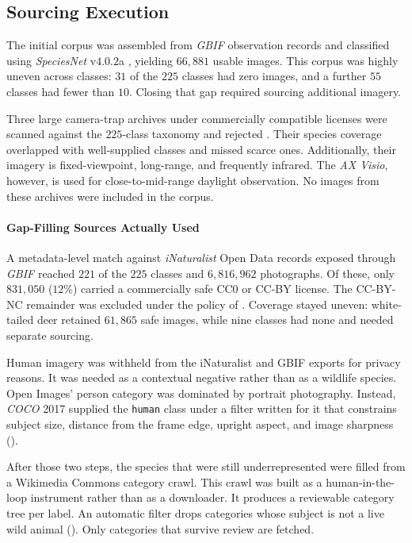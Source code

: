 \subsection{Sourcing Execution}\label{sec:sourcing_execution}

The initial corpus was assembled from \textit{GBIF} \cite{GBIF} observation records and classified using \textit{SpeciesNet} v$4.0.2$a \cite{gadotCropNotCrop2024a}, yielding $66{,}881$ usable images. This corpus was highly uneven across classes: $31$ of the $225$ classes had zero images, and a further $55$ classes had fewer than $10$. Closing that gap required sourcing additional imagery.

Three large camera-trap archives under commercially compatible licenses were scanned against the $225$-class taxonomy and rejected \cite{LILABCLabeled}. Their species coverage overlapped with well-supplied classes and missed scarce ones. Additionally, their imagery is fixed-viewpoint, long-range, and frequently infrared. The \textit{AX Visio}, however, is used for close-to-mid-range daylight observation. No images from these archives were included in the corpus.

\paragraph{Gap-Filling Sources Actually Used}
A metadata-level match against \textit{iNaturalist} Open Data records exposed through \textit{GBIF} reached $221$ of the $225$ classes and $6{,}816{,}962$ photographs. Of these, only $831{,}050$ ($12\%$) carried a commercially safe CC0 or CC-BY license. The CC-BY-NC remainder was excluded under the policy of . Coverage stayed uneven: white-tailed deer retained $61{,}865$ safe images, while nine classes had none and needed separate sourcing.

Human imagery was withheld from the iNaturalist and GBIF exports for privacy reasons. It was needed as a contextual negative rather than as a wildlife species. Open Images' person category was dominated by portrait photography. Instead, \textit{COCO} 2017 \cite{linMicrosoftCOCOCommon2015} supplied the \texttt{human} class under a filter written for it that constrains subject size, distance from the frame edge, upright aspect, and image sharpness ().  %

After those two steps, the species that were still underrepresented were filled from a Wikimedia Commons category crawl. This crawl was built as a human-in-the-loop instrument rather than as a downloader. It produces a reviewable category tree per label. An automatic filter drops categories whose subject is not a live wild animal (). Only categories that survive review are fetched.

